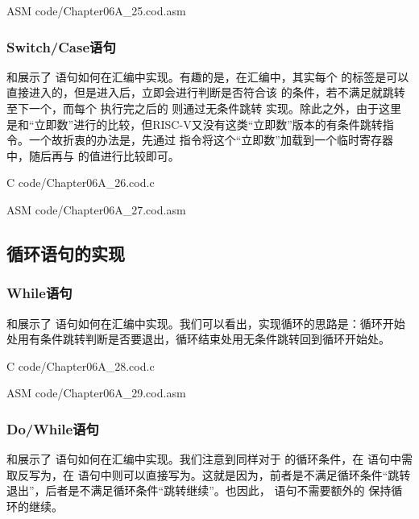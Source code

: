 \begin{Code}{ASM}
    code/Chapter06A_25.cod.asm
\end{Code}

\subsubsection{Switch/Case语句}
和展示了 语句如何在汇编中实现。有趣的是，在汇编中，其实每个 的标签是可以直接进入的，但是进入后，立即会进行判断是否符合该 的条件，若不满足就跳转至下一个，而每个 执行完之后的 则通过无条件跳转 实现。除此之外，由于这里 是和“立即数”进行的比较，但RISC-V又没有这类“立即数”版本的有条件跳转指令。一个故折衷的办法是，先通过 指令将这个“立即数”加载到一个临时寄存器 中，随后再与 的值进行比较即可。
\begin{Code}{C}
    code/Chapter06A_26.cod.c
\end{Code}

\begin{Code}{ASM}
    code/Chapter06A_27.cod.asm
\end{Code}

\subsection{循环语句的实现}

\subsubsection{While语句}
和展示了 语句如何在汇编中实现。我们可以看出，实现循环的思路是：循环开始处用有条件跳转判断是否要退出，循环结束处用无条件跳转回到循环开始处。
\begin{Code}{C}
    code/Chapter06A_28.cod.c
\end{Code}

\begin{Code}{ASM}
    code/Chapter06A_29.cod.asm
\end{Code}

\subsubsection{Do/While语句}
和展示了 语句如何在汇编中实现。我们注意到同样对于 的循环条件，在 语句中需取反写为，在 语句中则可以直接写为。这就是因为，前者是不满足循环条件“跳转退出”，后者是不满足循环条件“跳转继续”。也因此， 语句不需要额外的 保持循环的继续。 

